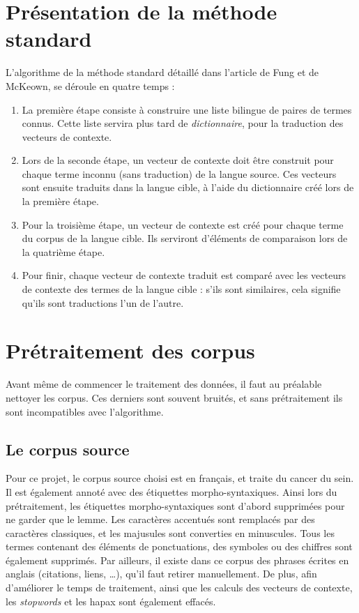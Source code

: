 
\section{Présentation de la méthode standard}

	L'algorithme de la méthode standard détaillé dans l'article de Fung et de McKeown, se déroule en quatre temps :
	\begin{enumerate}
		\item La première étape consiste à construire une liste bilingue de paires de termes connus. Cette liste servira plus tard de \textit{dictionnaire}, pour la traduction des vecteurs de contexte. 
		\item Lors de la seconde étape, un vecteur de contexte doit être construit pour chaque terme inconnu (sans traduction) de la langue source. Ces vecteurs sont ensuite traduits dans la langue cible, à l'aide du dictionnaire créé lors de la première étape.
		\item Pour la troisième étape, un vecteur de contexte est créé pour chaque terme du corpus de la langue cible. Ils serviront d'éléments de comparaison lors de la quatrième étape.
		\item Pour finir, chaque vecteur de contexte traduit est comparé avec les vecteurs de contexte des termes de la langue cible : s'ils sont similaires, cela signifie qu'ils sont traductions l'un de l'autre. 
	\end{enumerate}


\section{Prétraitement des corpus}
	
	Avant même de commencer le traitement des données, il faut au préalable nettoyer les corpus. Ces derniers sont souvent bruités, et sans prétraitement ils sont incompatibles avec l'algorithme.
	
	\subsection{Le corpus source}
	Pour ce projet, le corpus source choisi est en français, et traite du cancer du sein. Il est également annoté avec des étiquettes morpho-syntaxiques. Ainsi lors du prétraitement, les étiquettes morpho-syntaxiques sont d'abord supprimées pour ne garder que le lemme. Les caractères accentués sont remplacés par des caractères classiques, et les majusules sont converties en minuscules. Tous les termes contenant des éléments de ponctuations, des symboles ou des chiffres sont également supprimés. Par ailleurs, il existe dans ce corpus des phrases écrites en anglais (citations, liens, \dots), qu'il faut retirer manuellement. De plus, afin d'améliorer le temps de traitement, ainsi que les calculs des vecteurs de contexte, les \textit{stopwords} et les hapax sont également effacés.
		
